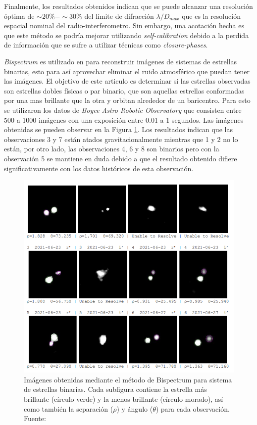 Finalmente, los resultados obtenidos indican que se puede alcanzar una resolución óptima de $\sim20\% - \sim30\%$ del límite de difracción $\lambda / D_{max}$ que es la resolución espacial nominal del radio-interferometro. Sin embargo, una acotación hecha es que este método se podría mejorar utilizando \textit{self-calibration} debido a la perdida de información que se sufre a utilizar técnicas como \textit{closure-phases}. 

\textit{Bispectrum} es utilizado en \citet{bowersobservations} para reconstruir imágenes de sistemas de estrellas binarias, esto para así aprovechar eliminar el ruido atmosférico que puedan tener las imágenes. El objetivo de este articulo es determinar si las estrellas observadas son estrellas dobles físicas o par binario, que son aquellas estrellas conformadas por una mas brillante que la otra y orbitan alrededor de un baricentro. Para esto se utilizaron los datos de \textit{Boyce Astro Robotic Observatory} que consisten entre 500 a 1000 imágenes con una exposición entre 0.01 a 1 segundos. Las imágenes obtenidas se pueden observar en la Figura \ref{fig:bin_star}. Los resultados indican que las observaciones 3 y 7 están atados gravitacionalmente mientras que 1 y 2 no lo están, por otro lado, las observaciones 4, 6 y 8 son binarios pero con la observación 5 se mantiene en duda debido a que el resultado obtenido difiere significativamente con los datos históricos de esta observación. 

\begin{figure}[!ht]
	\centering
	\captionsetup{justification=centering}
	\includegraphics[scale=0.6]{images/pares_estrellas.png}
	\caption[Sistema de estrellas binarias]{Imágenes obtenidas mediante el método de Bispectrum para sistema de estrellas binarias. Cada subfigura contiene la estrella más brillante (círculo verde) y la menos brillante (círculo morado), así como también la separación ($\rho$) y ángulo ($\theta$) para cada observación. Fuente: \citep{bowersobservations}}
	\label{fig:bin_star}
\end{figure}

